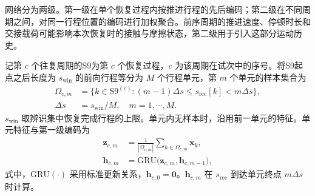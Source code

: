 \documentclass{JQRnew}
\begin{document}
网络分为两级。第一级在单个恢复过程内按推进行程的先后编码；第二级在不同周期之间，对同一行程位置的编码进行加权聚合。前序周期的推进速度、停顿时长和交接载荷可能影响本次恢复时的接触与摩擦状态，第二级用于引入这部分运动历史。

记第 $c$ 个往复周期的S9为第 $c$ 个恢复过程，$c$ 为该周期在试次中的序号。将S9起点之后长度为 $s_{\mathrm{win}}$ 的前向行程等分为 $M$ 个行程单元，第 $m$ 个单元的样本集合为
\begin{equation}
\label{eq:phase}
\begin{aligned}
\Omega_{c,m}&=\big\{k\in\mathrm{S9}^{(c)}:(m-1)\Delta s\le s_{\mathrm{rec}}[k]<m\Delta s\big\},\\
\Delta s&=s_{\mathrm{win}}/M,\quad m=1,\cdots,M.
\end{aligned}
\end{equation}
$s_{\mathrm{win}}$ 取辨识集中恢复完成行程的上限。单元内无样本时，沿用前一单元的特征。单元特征与第一级编码为
\begin{equation}
\label{eq:cell-encoder}
\begin{aligned}
\bm z_{c,m}&=\frac{1}{|\Omega_{c,m}|}\sum_{k\in\Omega_{c,m}}\bm x_k,\\
\bm h_{c,m}&=\mathrm{GRU}\big(\bm z_{c,m},\bm h_{c,m-1}\big),
\end{aligned}
\end{equation}
式中，$\mathrm{GRU}(\cdot)$ 采用标准更新关系，$\bm h_{c,0}=\bm 0$。$\bm h_{c,m}$ 在 $s_{\mathrm{rec}}$ 到达单元终点 $m\Delta s$ 时计算。
\end{document}
